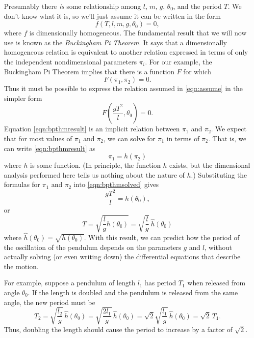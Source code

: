 Presumably there \emph{is} some relationship
among $l$, $m$, $g$, $\theta_0$, and the
period $T$. We don't know what it is, so we'll
just assume it can be written in the form
\begin{equation}
   f(T,l,m,g,\theta_0) = 0,
   \label{eqn:assume}
\end{equation}
where $f$ is dimensionally homogeneous.
The fundamental result that we will now use
is known as the \emph{Buckingham Pi Theorem}.
It says that a dimensionally homogeneous
relation is equivalent to another relation
expressed  in terms of only the independent
nondimensional parameters $\pi_i$.
For our example, the Buckingham Pi Theorem
implies that there is a function $F$
for which
\begin{equation}
   F(\pi_1,\pi_2) = 0.
   \label{eqn:bpthmresult}
\end{equation}
Thus it must be possible to
express the relation assumed in
\eqref{eqn:assume} in the simpler form
\begin{equation}
    F\left(\frac{gT^2}{l},\theta_0\right) = 0.
\end{equation}
Equation \eqref{eqn:bpthmresult}
is an implicit relation between $\pi_1$ and $\pi_2$.
We expect that for most values of $\pi_1$ and
$\pi_2$, we can solve for $\pi_1$ in terms
of $\pi_2$.  That is, we can write
\eqref{eqn:bpthmresult} as
\begin{equation}
    \pi_1 = h(\pi_2)
    \label{eqn:bpthmsolved}
\end{equation}
where $h$ is some function.
(In principle, the function $h$ exists,
but the dimensional analysis performed here
tells us nothing about the nature of $h$.)
Substituting the formulas for $\pi_1$ and $\pi_2$
into \eqref{eqn:bpthmsolved} gives
\begin{equation}
    \frac{gT^2}{l} = h(\theta_0),
\end{equation}
or
\begin{equation}
    T = \sqrt{\frac{l}{g} h(\theta_0)}
      = \sqrt{\frac{l}{g}}\, \hat{h}(\theta_0)
\end{equation}
where $\hat{h}(\theta_0) = \sqrt{h(\theta_0)}$.
With this result, we can predict how the period
of the oscillation of the pendulum depends on
the parameters $g$ and $l$, without actually
solving (or even writing down) the differential
equations that describe the motion.

For example, suppose a pendulum of length $l_1$ has
period $T_1$ when released from angle $\theta_0$.
If the length is doubled and the pendulum
is released from the same angle, the new period
must be
\begin{equation}
   T_2 = \sqrt{\frac{l_2}{g}} \, \hat{h}(\theta_0)
       = \sqrt{\frac{2l_1}{g}} \, \hat{h}(\theta_0)
       = \sqrt{2}\sqrt{\frac{l_1}{g}} \, \hat{h}(\theta_0)
       = \sqrt{2} \, T_1.
\end{equation}
Thus, doubling the length should cause the period
to increase by a factor of $\sqrt{2}$.

